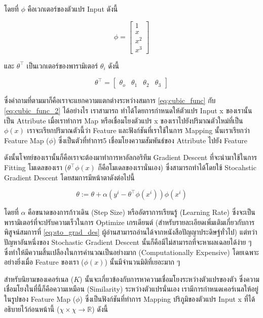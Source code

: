 โดยที่ $\phi$ คือเวกเตอร์ของตัวแปร Input ดังนี้

\begin{equation}
\phi = 
\begin{bmatrix}
    1 \\
    x \\
    x^{2} \\
    x^{3} 
\end{bmatrix}
\end{equation}

และ $\theta^{\top}$ เป็นเวกเตอร์ของพารามิเตอร์ $\theta_{i}$ ดังนี้

\begin{equation}
\theta^{\top} =
\begin{bmatrix}
    \theta_{o} & \theta_{1} & \theta_{2} & \theta_{3}
\end{bmatrix}
\end{equation}
 
ซึ่งคำถามที่ตามมาก็คือเราจะแยกความแตกต่างระหว่างสมการ \ref{eq:cubic_func} กับ \ref{eq:cubic_func_2} ได้อย่างไร เราสามารถ%
ทำได้โดยการกำหนดให้ตัวแปร Input x ของเรานั้นเป็น Attribute เมื่อเราทำการ Map หรือเชื่อมโยงตัวแปร x ของเราไปยังปริมาณตัวใหม่ที่เป็น
$\phi(x)$ เราจะเรียกปริมาณตัวนี้ว่า Feature และฟังก์ชันที่เราใช้ในการ Mapping นั้นเราเรียกว่า Feature Map ($\phi$) ซึ่งเป็นตัวที่ทำการ5
เชื่อมโยงความสัมพันธ์ของ Attribute ไปยัง Feature

ดังนั้นโจทย์ของเรานั้นก็คือเราจะต้องมาทำการหาอัลกอริทึม Gradient Descent ที่จะนำมาใช้ในการ Fitting โมเดลของเรา 
($\theta^{\top}\phi(x)$ ก็คือโมเดลของเรานั่นเอง) ซึ่งสามารถทำได้โดยใช้ Stocahstic Gradient Descent โดยสมการมีหน้าตาดังต่อไปนี้

\begin{equation}\label{eq:sto_grad_des}
    \theta := \theta + \alpha (y^{i} - \theta^{\top}\phi(x^{i}))\phi(x^{i})
\end{equation}

โดยที่ $\alpha$ คือขนาดของการก้าวเดิน (Step Size) หรืออัตราการเรียนรู้ (Learning Rate) ซึ่งจะเป็นพารามิเตอร์ที่จะปรับความเร็วในการ%
Optimize เกรเดียนต์ (สำหรับรายละเอียดเพิ่มเติมเกี่ยวกับการพิสูจน์สมการที่ \ref{eq:sto_grad_des} ผู้อ่านสามารถอ่านได้จากหนังสือปัญญาประดิษฐ์ทั่วไป) 
แต่ทว่าปัญหาอันหนึ่งของ Stochastic Gradient Descent นั้นก็คือมีไม่สามารถที่จะหาผลเฉลยได้ง่าย ๆ ซึ่งทำให้มีความสิ้นเปลืองในการคำนวณเป็นอย่างมาก 
(Computationally Expensive) โดยเฉพาะอย่างยิ่งเมื่อ Feature ของเรา ($\phi(x)$) นั้นมีจำนวนมิติที่เยอะมาก ๆ

สำหรับนิยามของเคอร์เนล ($K$) นั้นจะเกี่ยวข้องกับการหาความเชื่อมโยงระหว่างตัวแปรของตัว ซึ่งความเชื่อมโยงในที่นี้ก็คือความเหมือน (Similarity)
ระหว่างตัวแปรนั่นเอง เรามีการกำหนดเคอร์เนลให้อยู่ในรูปของ Feature Map ($\phi$) ซึ่งเป็นฟังก์ชันที่ทำการ Mapping ปริภูมิของตัวแปร Input x
ที่ได้อธิบายไว้ก่อนหน้านี้ ($\chi \times \chi \rightarrow \mathbb{R}$) ดังนี้


